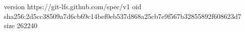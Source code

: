 version https://git-lfs.github.com/spec/v1
oid sha256:2d5cc38509a7d6cb69c14bef0eb537d868a25cb7e9f567b32855892f608623d7
size 262240
